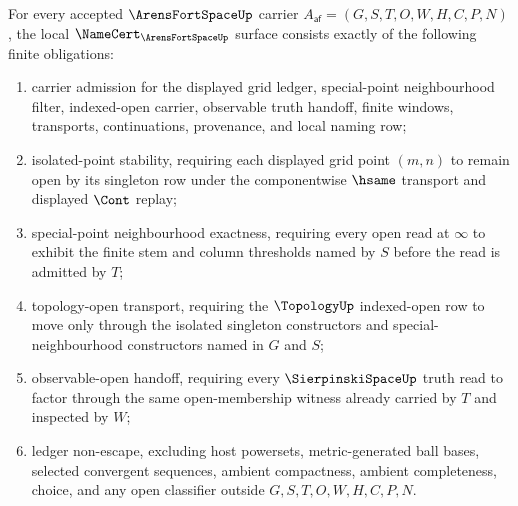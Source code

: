 \begin{theorem}
\label{thm:arens-fort-space-namecert-obligations}
For every accepted $\ArensFortSpaceUp$ carrier $A_{\mathsf{af}}=(G,S,T,O,W,H,C,P,N)$, the local $\NameCert_{\ArensFortSpaceUp}$ surface consists exactly of the following finite obligations:
\begin{enumerate}
\item carrier admission for the displayed grid ledger, special-point neighbourhood filter, indexed-open carrier, observable truth handoff, finite windows, transports, continuations, provenance, and local naming row;
\item isolated-point stability, requiring each displayed grid point $(m,n)$ to remain open by its singleton row under the componentwise $\hsame$ transport and displayed $\Cont$ replay;
\item special-point neighbourhood exactness, requiring every open read at $\infty$ to exhibit the finite stem and column thresholds named by $S$ before the read is admitted by $T$;
\item topology-open transport, requiring the $\TopologyUp$ indexed-open row to move only through the isolated singleton constructors and special-neighbourhood constructors named in $G$ and $S$;
\item observable-open handoff, requiring every $\SierpinskiSpaceUp$ truth read to factor through the same open-membership witness already carried by $T$ and inspected by $W$;
\item ledger non-escape, excluding host powersets, metric-generated ball bases, selected convergent sequences, ambient compactness, ambient completeness, choice, and any open classifier outside $G,S,T,O,W,H,C,P,N$.
\end{enumerate}
\end{theorem}
